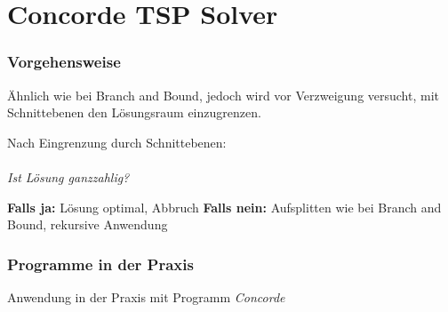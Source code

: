 \documentclass{beamer}
\begin{document}
  \section{Concorde TSP Solver}
  \begin{frame}
    \frametitle{Vorgehensweise}

    Ähnlich wie bei Branch and Bound, jedoch wird vor Verzweigung
    versucht, mit Schnittebenen den Lösungsraum einzugrenzen.

    \pause
    \vspace{1em}

    Nach Eingrenzung durch Schnittebenen: \\~\\
    \textit{Ist Lösung ganzzahlig?}

    \pause
    \vspace{1em}

    \textbf{Falls ja:} Lösung optimal, Abbruch
    \pause
    \textbf{Falls nein:} Aufsplitten wie bei Branch and Bound, rekursive Anwendung
  \end{frame}

  \begin{frame}
    \frametitle{Programme in der Praxis}
    Anwendung in der Praxis mit Programm \textit{Concorde}
  \end{frame}
\end{document}
